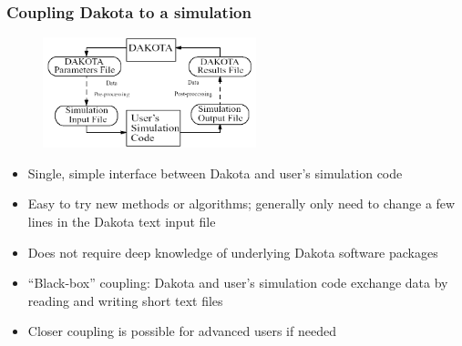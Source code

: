 \documentclass[t]{beamer}
\begin{document}
\begin{frame}
  \frametitle{Coupling Dakota to a simulation}
  \begin{figure}
    \includegraphics[height=32mm]{images/blackbox.png}
  \end{figure}
  \begin{itemize}
    \item Single, simple interface between Dakota and user's simulation code
    \item Easy to try new methods or algorithms; generally only need to change a
          few lines in the Dakota text input file
    \item Does not require deep knowledge of underlying Dakota software packages
    \item ``Black-box'' coupling: Dakota and user's simulation code
          exchange data by reading and writing short text files
    \item Closer coupling is possible for advanced users if needed
  \end{itemize}
\end{frame}

\end{document}
